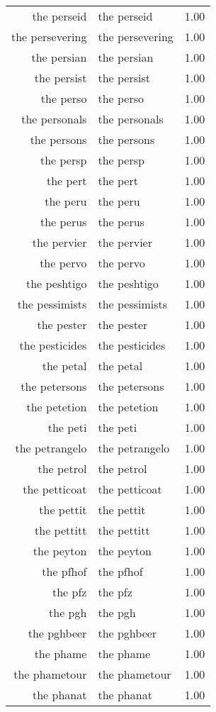 \begin{table}[ht]
\begin{tabular}{rlr}
  the perseid & the perseid & 1.00 \\ 
  the persevering & the persevering & 1.00 \\ 
  the persian & the persian & 1.00 \\ 
  the persist & the persist & 1.00 \\ 
  the perso & the perso & 1.00 \\ 
  the personals & the personals & 1.00 \\ 
  the persons & the persons & 1.00 \\ 
  the persp & the persp & 1.00 \\ 
  the pert & the pert & 1.00 \\ 
  the peru & the peru & 1.00 \\ 
  the perus & the perus & 1.00 \\ 
  the pervier & the pervier & 1.00 \\ 
  the pervo & the pervo & 1.00 \\ 
  the peshtigo & the peshtigo & 1.00 \\ 
  the pessimists & the pessimists & 1.00 \\ 
  the pester & the pester & 1.00 \\ 
  the pesticides & the pesticides & 1.00 \\ 
  the petal & the petal & 1.00 \\ 
  the petersons & the petersons & 1.00 \\ 
  the petetion & the petetion & 1.00 \\ 
  the peti & the peti & 1.00 \\ 
  the petrangelo & the petrangelo & 1.00 \\ 
  the petrol & the petrol & 1.00 \\ 
  the petticoat & the petticoat & 1.00 \\ 
  the pettit & the pettit & 1.00 \\ 
  the pettitt & the pettitt & 1.00 \\ 
  the peyton & the peyton & 1.00 \\ 
  the pfhof & the pfhof & 1.00 \\ 
  the pfz & the pfz & 1.00 \\ 
  the pgh & the pgh & 1.00 \\ 
  the pghbeer & the pghbeer & 1.00 \\ 
  the phame & the phame & 1.00 \\ 
  the phametour & the phametour & 1.00 \\ 
  the phanat & the phanat & 1.00 \\ 

\end{tabular}
\end{table}
